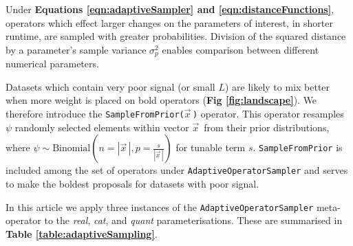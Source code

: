 \documentclass[10pt,letterpaper]{article}
\begin{document}





Under \textbf{Equations \ref{eqn:adaptiveSampler} and \ref{eqn:distanceFunctions}}, operators which effect larger changes on the parameters of interest, in shorter runtime, are sampled with greater probabilities. 
Division of the squared distance by a parameter's sample variance $\sigma^2_p$ enables comparison between different numerical parameters.


Datasets which contain very poor signal (or small $L$) are likely to mix better when more weight is placed on bold operators (\textbf{Fig \ref{fig:landscape}}). 
We therefore introduce the \texttt{SampleFromPrior($\vec{x}^{\,}$)} operator.
This operator resamples $\psi$ randomly selected elements within vector $\vec{x}^{\,}$ from their prior distributions, where $\psi \sim \text{Binomial}(n=|\vec{x}^{\,}|, p=\frac{s}{|\vec{x}^{\,}|})$ for tunable term $s$.
\texttt{SampleFromPrior} is included among the set of operators under \texttt{AdaptiveOperatorSampler} and serves to make the boldest proposals for datasets with poor signal.
 






In this article we apply three instances of the \texttt{AdaptiveOperatorSampler} meta-operator to the \textit{real}, \textit{cat}, and \textit{quant} parameterisations. 
These are summarised in \textbf{Table \ref{table:adaptiveSampling}}.
\end{document}
